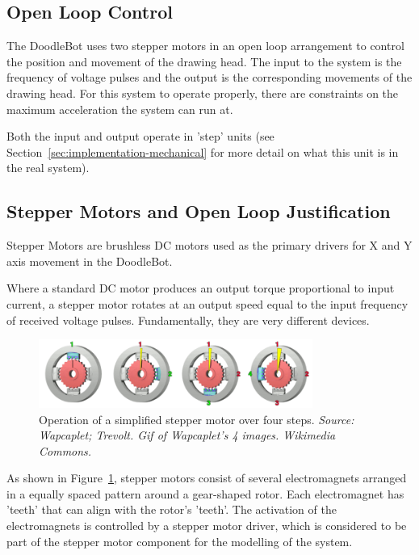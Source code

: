 \subsection{Open Loop Control}
	The DoodleBot uses two stepper motors in an open loop arrangement to control the position and movement of the drawing head. The input to the system is the frequency of voltage pulses and the output is the corresponding movements of the drawing head. For this system to operate properly, there are constraints on the maximum acceleration the system can run at.
	
	Both the input and output operate in 'step' units (see Section~\ref*{sec:implementation-mechanical} for more detail on what this unit is in the real system).
	
\subsection{Stepper Motors and Open Loop Justification}
		\label{sec:control-stepper}
			
		Stepper Motors are brushless DC motors used as the primary drivers for X and Y axis movement in the DoodleBot. 
		
		Where a standard DC motor produces an output torque proportional to input current, a stepper motor rotates at an output speed equal to the input frequency of received voltage pulses. Fundamentally, they are very different devices.
		
		\begin{figure}[h]
			\centering
			\includegraphics[width=0.8\textwidth]{figures/optimisation/steppermotor}
			\caption[Operation of a simple stepper motor]{Operation of a simplified stepper motor over four steps. \textit{Source: Wapcaplet; Trevolt. Gif of Wapcaplet's 
			4 images. Wikimedia Commons.\cite{website:stepper}}}
			\label{fig:stepper}
		\end{figure}
		
		As shown in Figure~\ref{fig:stepper}, stepper motors consist of several electromagnets arranged in a equally spaced pattern around a gear-shaped rotor. Each electromagnet has 'teeth' that can align with the rotor's 'teeth'. The activation of the electromagnets is controlled by a stepper motor driver, which is considered to be part of the stepper motor component for the modelling of the system.
		
